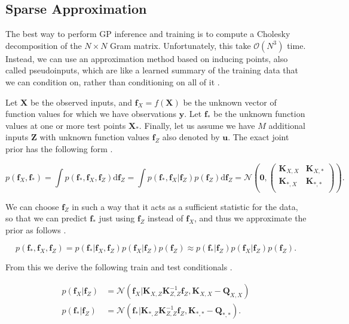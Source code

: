 \documentclass[../../../main.tex]{subfiles}
\begin{document}
\subsection{Sparse Approximation}

The best way to perform GP inference and training is to compute a Cholesky decomposition of the $N \times N$ Gram matrix. Unfortunately, this take $\mathcal{O}(N^3)$ time. Instead, we can use an approximation method based on inducing points, also called pseudoinputs, which are like a learned summary of the training data that we can condition on, rather than conditioning on all of it \autocite{Murphy2023}.

Let $\bm{X}$ be the observed inputs, and $\bm{f}_X=f(\bm{X})$ be the unknown vector of function values for which we have observations $\bm{y}$. Let $\bm{f}_\ast$ be the unknown function values at one or more test points $\bm{X}_\ast$. Finally, let us assume we have $M$ additional inputs $\bm{Z}$ with unknown function values $\bm{f}_Z$ also denoted by $\bm{u}$. The exact joint prior has the following form \autocite{Murphy2023}.

\begin{equation}
p(\bm{f}_X,\bm{f}_\ast)
= \int p(\bm{f}_\ast,\bm{f}_X,\bm{f}_Z)\mathrm{d}\bm{f}_Z
= \int p(\bm{f}_\ast,\bm{f}_X|\bm{f}_Z)p(\bm{f}_Z)\mathrm{d}\bm{f}_Z
= \mathcal{N}\left(\bm{0},
\begin{pmatrix}
\bm{K}_{X,X} & \bm{K}_{X,\ast} \\
\bm{K}_{\ast,X} & \bm{K}_{\ast,\ast} \\
\end{pmatrix}
\right).
\end{equation}

We can choose $\bm{f}_Z$ in such a way that it acts as a sufficient statistic for the data, so that we can predict $\bm{f}_\ast$ just using $\bm{f}_Z$ instead of $\bm{f}_X$, and thus we approximate the prior as follows \autocite{Murphy2023}.

\begin{equation}
p(\bm{f}_\ast,\bm{f}_X,\bm{f}_Z)
= p(\bm{f}_\ast|\bm{f}_X,\bm{f}_Z)p(\bm{f}_X|\bm{f}_Z)p(\bm{f}_Z)
\approx p(\bm{f}_\ast|\bm{f}_Z)p(\bm{f}_X|\bm{f}_Z)p(\bm{f}_Z).
\end{equation}

From this we derive the following train and test conditionals \autocite{Murphy2023}.

\begin{align}
p(\bm{f}_X|\bm{f}_Z) &= \mathcal{N}(\bm{f}_X|\bm{K}_{X,Z}\bm{K}_{Z,Z}^{-1}\bm{f}_Z,\bm{K}_{X,X}-\bm{Q}_{X,X}) \\
p(\bm{f}_\ast|\bm{f}_Z) &= \mathcal{N}(\bm{f}_\ast|\bm{K}_{\ast,Z}\bm{K}_{Z,Z}^{-1}\bm{f}_Z,\bm{K}_{\ast,\ast}-\bm{Q}_{\ast,\ast}).
\end{align}
\end{document}
